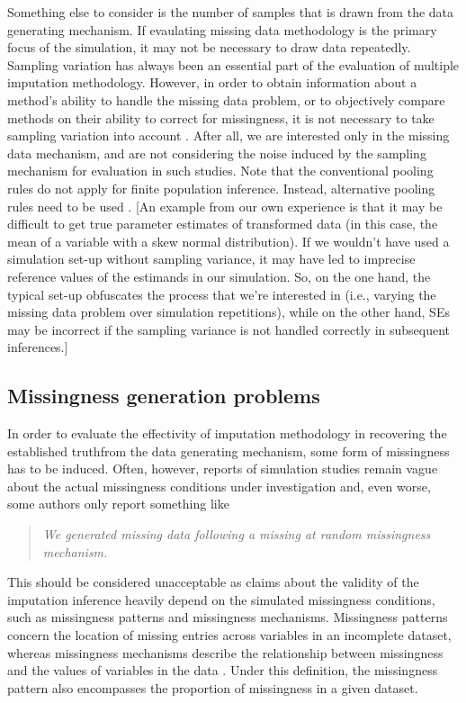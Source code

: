 \documentclass[bimj,fleqn]{w-art}
\theoremstyle{plain}
\theoremstyle{definition}
\begin{document}
Something else to consider is the number of samples that is drawn from the data generating mechanism. If evaulating missing data methodology is the primary focus of the simulation, it may not be necessary to draw data repeatedly. Sampling variation has always been an essential part of the evaluation of multiple imputation methodology. However, in order to obtain information about a method's ability to handle the missing data problem, or to objectively compare methods on their ability to correct for missingness, it is not necessary to take sampling variation into account \citep{vink14}. After all, we are interested only in the missing data mechanism, and are not considering the noise induced by the sampling mechanism for evaluation in such studies. Note that the conventional pooling rules \citep[cf.][p. 76-77]{rubi87} do not apply for finite population inference. Instead, alternative pooling rules need to be used \citep{raghunathan2003multiple,vink14}. [An example from our own experience is that it may be difficult to get true parameter estimates of transformed data (in this case, the mean of a variable with a skew normal distribution). If we wouldn't have used a simulation set-up without sampling variance, it may have led to imprecise reference values of the estimands in our simulation. So, on the one hand, the typical set-up obfuscates the process that we're interested in (i.e., varying the missing data problem over simulation repetitions), while on the other hand, SEs may be incorrect if the sampling variance is not handled correctly in subsequent inferences.] %



\subsection{Missingness generation problems}

In order to evaluate the effectivity of imputation methodology in recovering the established truthfrom the data generating mechanism, some form of missingness has to be induced. Often, however, reports of simulation studies remain vague about the actual missingness conditions under investigation and, even worse, some authors only report something like
\begin{quote}
\textit{We generated missing data following a missing at random missingness mechanism.}
\end{quote}
This should be considered unacceptable as claims about the validity of the imputation inference heavily depend on the simulated missingness conditions, such as missingness patterns and missingness mechanisms. Missingness patterns concern the location of missing entries across variables in an incomplete dataset, whereas missingness mechanisms describe the relationship between missingness and the values of variables in the data \citep[][p. 8]{litt20}. Under this definition, the missingness pattern also encompasses the proportion of missingness in a given dataset. 
\end{document}
